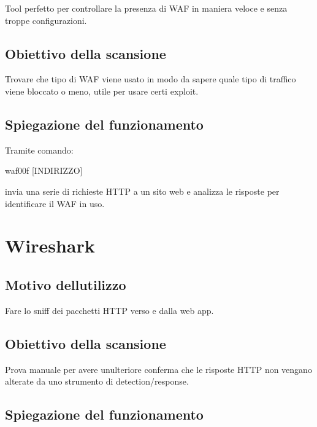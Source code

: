 \documentclass[
]{article}
\begin{document}
{Tool perfetto per controllare la presenza di WAF in maniera veloce e
senza troppe configurazioni.}

\subsection{\texorpdfstring{{Obiettivo della
scansione}}{Obiettivo della scansione}}\label{h.mmz6tca61ulu}

{Trovare che tipo di WAF viene usato in modo da sapere quale tipo di
traffico viene bloccato o meno, utile per usare certi exploit.}

\subsection{\texorpdfstring{{Spiegazione del
funzionamento}}{Spiegazione del funzionamento}}\label{h.1p6jyw29r7y3}

{Tramite comando:}

{waf00f {[}INDIRIZZO{]}}

{}

{invia una serie di richieste HTTP a un sito web e analizza le risposte
per identificare il WAF in uso.}

{}

\section{\texorpdfstring{{Wireshark}}{Wireshark}}\label{h.n379yqkt947w}

\subsection{\texorpdfstring{{Motivo
dell\textquotesingle utilizzo}}{Motivo dell\textquotesingle utilizzo}}\label{h.grnxuxqwt1j5}

{Fare lo sniff dei pacchetti HTTP verso e dalla web app.}

\subsection{\texorpdfstring{{Obiettivo della
scansione}}{Obiettivo della scansione}}\label{h.x3c31ml4fogs}

{Prova manuale per avere un\textquotesingle ulteriore conferma che le
risposte HTTP non vengano alterate da uno strumento di
detection/response.}

\subsection{\texorpdfstring{{Spiegazione del
funzionamento}}{Spiegazione del funzionamento}}\label{h.4wk6nd6xtx0s}
\end{document}
